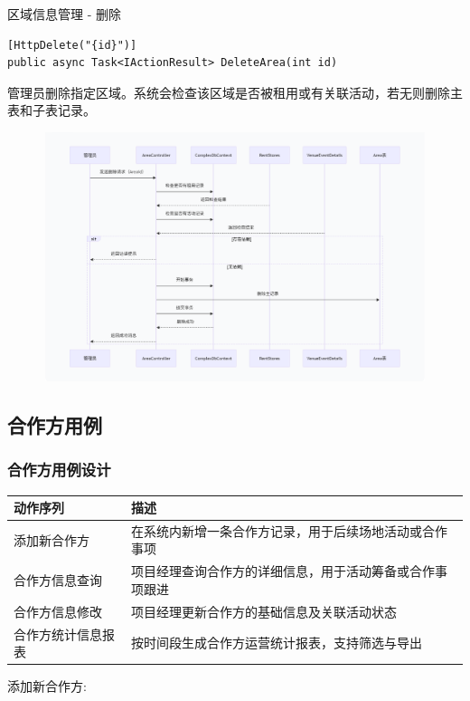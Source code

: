 \documentclass[]{article}
\let\oldincludegraphics\includegraphics
\renewcommand{\includegraphics}[2][]{%
  \begin{center}\oldincludegraphics[#1]{#2}\end{center}%
}
\begin{document}
区域信息管理 - 删除

\begin{verbatim}
[HttpDelete("{id}")]
public async Task<IActionResult> DeleteArea(int id)
\end{verbatim}
管理员删除指定区域。系统会检查该区域是否被租用或有关联活动，若无则删除主表和子表记录。

\includegraphics[width=5.64167in,height=2.86458in]{media/media/image_2-3-7.png}

\hypertarget{ux7528ux4f8b-2}{%
  \subsection{合作方用例}\label{ux7528ux4f8b-2}}

\hypertarget{ux7528ux4f8b-2ux8bbeux8ba1}{%
  \subsubsection{合作方用例设计}\label{ux7528ux4f8b-2ux8bbeux8ba1}}

\begin{longtable}[]{@{}ll@{}}
  \toprule
  \textbf{动作序列} & \textbf{描述}                  \\
  \midrule
  \endhead
  添加新合作方        & 在系统内新增一条合作方记录，用于后续场地活动或合作事项  \\
  合作方信息查询       & 项目经理查询合作方的详细信息，用于活动筹备或合作事项跟进 \\
  合作方信息修改       & 项目经理更新合作方的基础信息及关联活动状态        \\
  合作方统计信息报表     & 按时间段生成合作方运营统计报表，支持筛选与导出      \\
  \bottomrule
\end{longtable}

添加新合作方:
\end{document}
